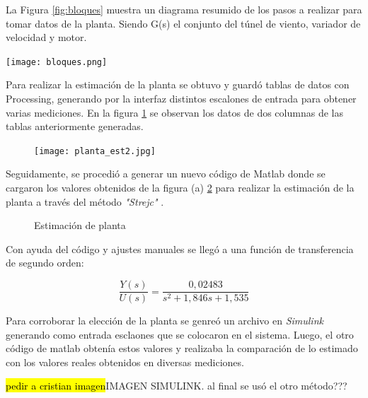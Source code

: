     La Figura \ref{fig:bloques} muestra un diagrama resumido de los pasos a realizar para tomar datos de la planta. Siendo G(s) el conjunto del túnel de viento, variador de velocidad y motor.
 
    \begin{center}
    	\texttt{[image: bloques.png]}
    	\label{fig:bloques}    
    \end{center}
    
    Para realizar la estimación de la planta se obtuvo y guardó tablas de datos con Processing, generando por la interfaz distintos escalones de entrada para obtener varias mediciones. En la figura \ref{fig:est2} se observan los datos de dos columnas de las tablas anteriormente generadas.
    
    \begin{figure}[htb]
    	\centering
    	\texttt{[image: planta\_est2.jpg]}
    	\label{fig:est2}    
    \end{figure}
    
    Seguidamente, se procedió a generar un nuevo código de Matlab donde se cargaron los valores obtenidos de la figura (a) \ref{fig:pl2} para realizar la estimación de la planta a través del método \textit{"Strejc"} \cite{pomares2011sistemas}.
    
    \begin{figure}[htbp]
    	\centering
    	\caption{Estimación de planta} \label{fig:pl2}
    \end{figure}
    
    Con ayuda del código y ajustes manuales se llegó a una función de transferencia de segundo orden:
    
    \begin{equation}
    	\frac{Y(s)}{U(s)}=\frac{0,02483}{s^2+1,846s+1,535}
    \end{equation}
    
    Para corroborar la elección de la planta se genreó un archivo en \textit{Simulink} generando como entrada esclaones que se colocaron en el sistema. Luego, el otro código de matlab obtenía estos valores y realizaba la comparación de lo estimado con los valores reales obtenidos en diversas mediciones.
    
    \hl{pedir a cristian imagen}IMAGEN SIMULINK. al final se usó el otro método???
    
